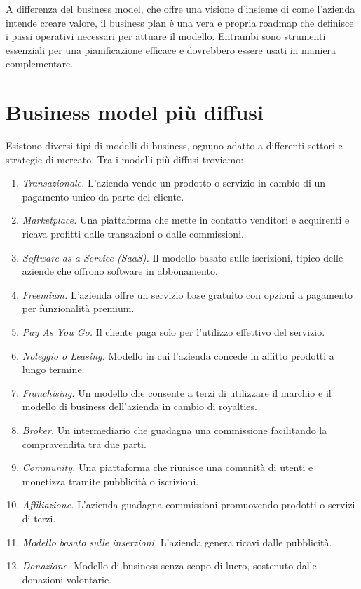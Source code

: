A differenza del business model, che offre una visione d’insieme di come l’azienda intende creare valore, il business plan è una vera e propria roadmap che definisce i passi operativi necessari per attuare il modello. Entrambi sono strumenti essenziali per una pianificazione efficace e dovrebbero essere usati in maniera complementare.

\section{Business model più diffusi}
Esistono diversi tipi di modelli di business, ognuno adatto a differenti settori e strategie di mercato. Tra i modelli più diffusi troviamo:
\begin{enumerate}
    \item \textit{Transazionale.} L’azienda vende un prodotto o servizio in cambio di un pagamento unico da parte del cliente.
    \item \textit{Marketplace.} Una piattaforma che mette in contatto venditori e acquirenti e ricava profitti dalle transazioni o dalle commissioni.
    \item \textit{Software as a Service (SaaS).} Il modello basato sulle iscrizioni, tipico delle aziende che offrono software in abbonamento.
    \item \textit{Freemium.} L’azienda offre un servizio base gratuito con opzioni a pagamento per funzionalità premium.
    \item \textit{Pay As You Go.} Il cliente paga solo per l’utilizzo effettivo del servizio.
    \item \textit{Noleggio o Leasing.} Modello in cui l’azienda concede in affitto prodotti a lungo termine.
    \item \textit{Franchising.} Un modello che consente a terzi di utilizzare il marchio e il modello di business dell’azienda in cambio di royalties.
    \item \textit{Broker.} Un intermediario che guadagna una commissione facilitando la compravendita tra due parti.
    \item \textit{Community.} Una piattaforma che riunisce una comunità di utenti e monetizza tramite pubblicità o iscrizioni.
    \item \textit{Affiliazione.} L’azienda guadagna commissioni promuovendo prodotti o servizi di terzi.
    \item \textit{Modello basato sulle inserzioni.} L’azienda genera ricavi dalle pubblicità.
    \item \textit{Donazione.} Modello di business senza scopo di lucro, sostenuto dalle donazioni volontarie.
\end{enumerate}

